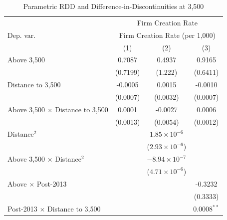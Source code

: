 
\begin{table}[htbp]
   \caption{\label{tab:parametric} Parametric RDD and Difference-in-Discontinuities at 3,500}
   \bigskip
   \centering
   \begin{tabular}{lccc}
      \toprule
       & \multicolumn{3}{c}{Firm Creation Rate}\\
      Dep. var. & \multicolumn{3}{c}{Firm Creation Rate (per 1,000)} \\ 
                                                                  & (1)           & (2)                     & (3)\\  
      \midrule 
      Above 3,500                                                 & 0.7087        & 0.4937                  & 0.9165\\   
                                                                  & (0.7199)      & (1.222)                 & (0.6411)\\   
      Distance to 3,500                                           & -0.0005       & 0.0015                  & -0.0010\\   
                                                                  & (0.0007)      & (0.0032)                & (0.0007)\\   
      Above 3,500 $\times$ Distance to 3,500                      & 0.0001        & -0.0027                 & 0.0006\\   
                                                                  & (0.0013)      & (0.0054)                & (0.0012)\\   
      Distance$^2$                                                &               & $1.85\times 10^{-6}$    &   \\   
                                                                  &               & ($2.93\times 10^{-6}$)  &   \\   
      Above 3,500 $\times$ Distance$^2$                           &               & $-8.94\times 10^{-7}$   &   \\   
                                                                  &               & ($4.71\times 10^{-6}$)  &   \\   
      Above $\times$ Post-2013                                    &               &                         & -0.3232\\   
                                                                  &               &                         & (0.3333)\\   
      Post-2013 $\times$ Distance to 3,500                        &               &                         & 0.0008$^{**}$\\   

\end{tabular}
\end{table}
